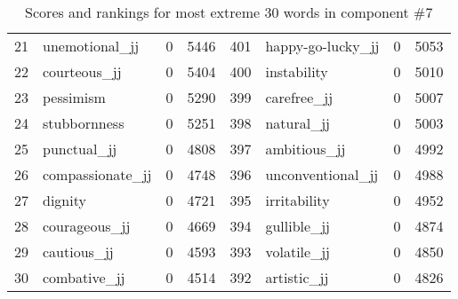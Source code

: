 \begin{table}[tbp]
\begin{tabular}{| rlr@{.}l | rlr@{.}l |}
    21 & unemotional\_jj & 0 & 5446    &    401 & happy-go-lucky\_jj & 0 & 5053 \\
    22 & courteous\_jj & 0 & 5404    &    400 & instability & 0 & 5010 \\
    23 & pessimism & 0 & 5290    &    399 & carefree\_jj & 0 & 5007 \\
    24 & stubbornness & 0 & 5251    &    398 & natural\_jj & 0 & 5003 \\
    25 & punctual\_jj & 0 & 4808    &    397 & ambitious\_jj & 0 & 4992 \\
    26 & compassionate\_jj & 0 & 4748    &    396 & unconventional\_jj & 0 & 4988 \\
    27 & dignity & 0 & 4721    &    395 & irritability & 0 & 4952 \\
    28 & courageous\_jj & 0 & 4669    &    394 & gullible\_jj & 0 & 4874 \\
    29 & cautious\_jj & 0 & 4593    &    393 & volatile\_jj & 0 & 4850 \\
    30 & combative\_jj & 0 & 4514    &    392 & artistic\_jj & 0 & 4826 \\
    \hline
    \end{tabular}
    \caption{Scores and rankings for most extreme 30 words in component \#7} 
\end{table}
\clearpage
